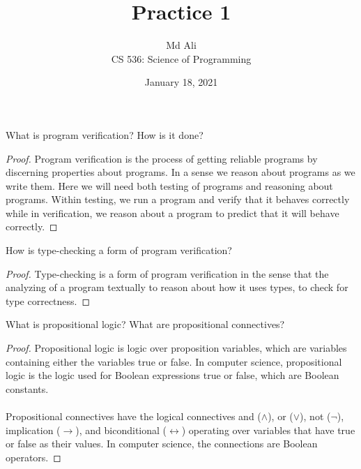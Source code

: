 \documentclass[12pt]{article}
\newenvironment{exercise}[2][Exercise]{\begin{trivlist}
\item[\hskip \labelsep {\bfseries #1}\hskip \labelsep {\bfseries #2.}]}{\end{trivlist}}
\begin{document}
 
\title{Practice 1}
\author{Md Ali \\ 
CS 536: Science of Programming} 
\date{January 18, 2021}

\maketitle
 
\begin{exercise}{1}
What is program verification? How is it done?
\end{exercise} 

\begin{proof}
Program verification is the process of getting reliable programs by discerning properties about programs. In a sense we reason about programs as we write them. Here we will need both testing of programs and reasoning about programs. Within testing, we run a program and verify that it behaves correctly while in verification, we reason about a program to predict that it will behave correctly. 

\end{proof}

\begin{exercise}{2}
How is type-checking a form of program verification? 
\end{exercise}
 
\begin{proof}
Type-checking is a form of program verification in the sense that the analyzing of a program textually to reason about how it uses types, to check for type correctness. 

\end{proof}

\begin{exercise}{3}
What is propositional logic? What are propositional connectives?
\end{exercise}

\begin{proof}
Propositional logic is logic over proposition variables, which are variables containing either the variables true or false. In computer science, propositional logic is the logic used for Boolean expressions true or false, which are Boolean constants. \\ \\
Propositional connectives have the logical connectives and ($\land$), or ($\lor$), not ($\neg$), implication ($\rightarrow$), and biconditional ($\leftrightarrow$) operating over variables that have true or false as their values. In computer science, the connections are Boolean operators. 

\end{proof}
 
\end{document}
